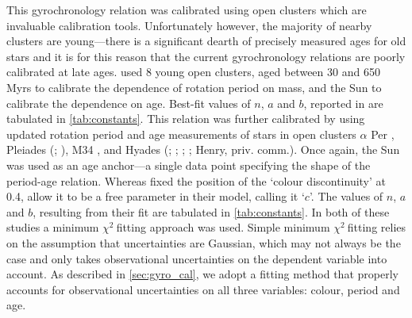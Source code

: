 \documentclass[10pt,preprint]{aastex}
\newcommand{\chit}{$\chi^2$}
\begin{document}
This gyrochronology relation was calibrated using open clusters which are invaluable calibration tools.
Unfortunately however, the majority of nearby clusters are young---there is a significant dearth of precisely measured ages for old stars and it is for this reason that the current gyrochronology relations are poorly calibrated at late ages.
\citet{Barnes2007} used 8 young open clusters, aged between 30 and 650 Myrs to calibrate the dependence of rotation period on mass, and the Sun to calibrate the dependence on age.
Best-fit values of $n$, $a$ and $b$, reported in \citet{Barnes2007} are tabulated in \ref{tab:constants}.
This relation was further calibrated by \citet{Mamajek2008} using updated rotation period and age measurements of stars in open clusters $\alpha$ Per \citep{Prosser1995}, Pleiades (\citealt{Prosser2005}; \citealt{Krishnamurthi1998}), M34 \citep{Meibom2011_M34}, and Hyades (\citealt{Radick1987}; \citealt{Prosser1995}; \citealt{Radick1995}; \citealt{Paulson2004}; Henry, priv. comm.).
Once again, the Sun was used as an age anchor---a single data point specifying the shape of the period-age relation.
Whereas \citet{Barnes2007} fixed the position of the `colour discontinuity' at 0.4, \citet{Mamajek2008} allow it to be a free parameter in their model, calling it `$c$'.
The values of $n$, $a$ and $b$, resulting from their fit are tabulated in \ref{tab:constants}.
In both of these studies a minimum \chit$~$fitting approach was used.
Simple minimum \chit$~$fitting relies on the assumption that uncertainties are Gaussian, which may not always be the case and only takes observational uncertainties on the dependent variable into account.
As described in \textsection \ref{sec:gyro_cal}, we adopt a fitting method that properly accounts for observational uncertainties on all three variables: colour, period and age.
\end{document}

